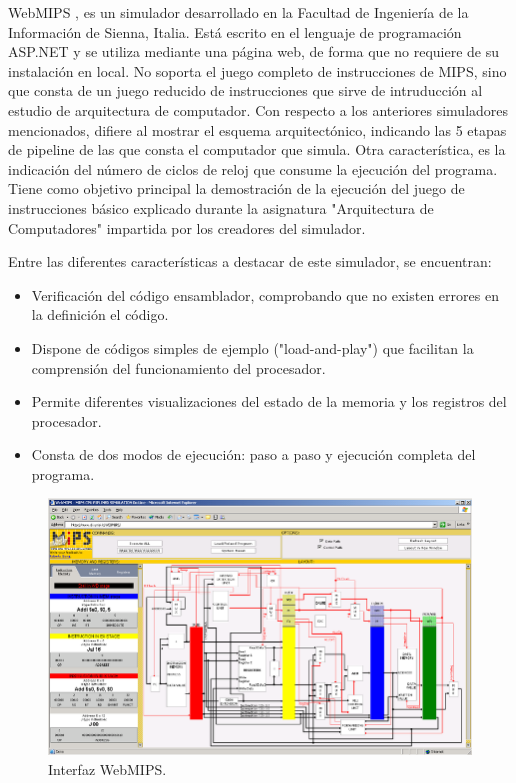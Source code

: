 WebMIPS \cite{branovic2004webmips}, es un simulador desarrollado en la Facultad de Ingeniería de la Información de Sienna, Italia. Está escrito en el lenguaje de programación ASP.NET y se utiliza mediante una página web, de forma que no requiere de su instalación en local. No soporta el juego completo de instrucciones de MIPS, sino que consta de un juego reducido de instrucciones que sirve de intruducción al estudio de arquitectura de computador. Con respecto a los anteriores simuladores mencionados, difiere al mostrar el esquema arquitectónico, indicando las 5 etapas de pipeline de las que consta el computador que simula. Otra característica, es la indicación del número de ciclos de reloj que consume la ejecución del programa. Tiene como objetivo principal la demostración de la ejecución del juego de instrucciones básico explicado durante la asignatura "Arquitectura de Computadores" impartida por los creadores del simulador.

Entre las diferentes características a destacar de este simulador, se encuentran:

\begin{itemize}
	
\item Verificación del código ensamblador, comprobando que no existen errores en la definición el código.

\item Dispone de códigos simples de ejemplo ("load-and-play") que facilitan la comprensión del funcionamiento del procesador.

\item Permite diferentes visualizaciones del estado de la memoria y los registros del procesador.

\item Consta de dos modos de ejecución: paso a paso y ejecución completa del programa.
	
\end{itemize}

\begin{figure}[htbp]
 	\centering
 	\includegraphics[width=12cm]{figures/webmips_figure}
 	\caption{ Interfaz WebMIPS.}
	\label{fig:qtspim_figure}
\end{figure}

